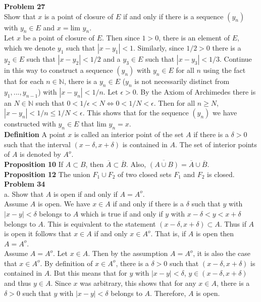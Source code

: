 \documentclass[a4paper]{article}
\begin{document}
{\bf Problem 27}\\
Show that $x$ is a point of closure of $E$ if and only if there is a sequence $(y_n)$ with $y_n \in E$ and $x = \text{lim } y_n$. \\

Let $x$ be a point of closure of $E$. Then since $1>0$, there is an element of $E$, which we denote $y_1$ such that $|x-y_1| < 1$. Similarly, since $1/2 > 0$ there is a $y_2 \in E$ such that $|x-y_2|<1/2$ and a $y_3 \in E$ such that $|x-y_3| < 1/3$. Continue in this way to construct a sequence $(y_n)$ with $y_n \in E$ for all $n$ using the fact that for each $n \in \mathbb{N}$, there is a $y_n \in E$ ($y_n$ is not necessarily distinct from $y_1,...,y_{n-1}$) with $|x-y_n| < 1/n$. Let $\epsilon>0$. By the Axiom of Archimedes there is an $N \in \mathbb{N}$ such that $0<1/\epsilon < N \iff 0<1/N < \epsilon$. Then for all $n\geq N$, $|x-y_n| < 1/n \leq 1/N < \epsilon$. This shows that for the sequence $(y_n)$ we have constructed with $y_n \in E$ that lim $y_n = x$.\\ 


{\bf Definition} A point $x$ is called an interior point of the set $A$ if there is a $\delta >0$ such that the interval $(x-\delta, x+\delta)$ is contained in $A$. The set of interior points of $A$ is denoted by $A^o$.\\

{\bf Proposition 10} If $A\subset B$, then $\overline{A}\subset \overline{B}$. Also, $\overline{(A\cup B)} = \overline{A}\cup \overline{B}$. \\

{\bf Proposition 12} The union $F_1\cup F_2$ of two closed sets $F_1$ and $F_2$ is closed. \\

{\bf Problem 34}\\

a. Show that $A$ is open if and only if $A = A^o$.\\

Assume $A$ is open. We have $x \in A$ if and only if there is a $\delta$ such that $y$ with $|x-y|<\delta$ belongs to $A$ which is true if and only if $y$ with $x-\delta < y < x+\delta$ belongs to $A$. This is equivalent to the statement $(x-\delta, x+\delta) \subset A$. Thus if $A$ is open it follows that $x \in A$ if and only $x \in A^o$. That is, if $A$ is open then $A = A^o$. \\

Assume $A = A^o$. Let $x \in A$. Then by the assumption $A = A^o$, it is also the case that $x \in A^o$. By definition of $x \in A^o$, there is a $\delta > 0$ such that $(x-\delta, x+\delta)$ is contained in $A$. But this means that for $y$ with $|x-y|<\delta$, $y \in (x-\delta,x+\delta)$ and thus $y \in A$. Since $x$ was arbitrary, this shows that for any $x \in A$, there is a $\delta > 0$ such that $y$ with $|x-y|<\delta$ belongs to $A$. Therefore, $A$ is open. 
\end{document}

